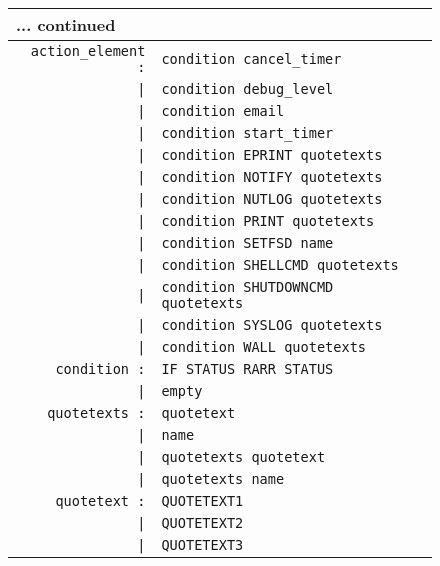 \documentclass[12pt]{article}
\begin{document}
\begin{figure}[ht]
\begin{center}
\begin{tabular}{|rp{0.55\LinePrinterwidth}|p{0.3\LinePrinterwidth}|}
\hline
\multicolumn{3}{|l|}{\small ... continued} \\ \hline\hline
\texttt{action\_element :} & \texttt{condition cancel\_timer} & \\
                \texttt{|} & \texttt{condition debug\_level} & \\
                \texttt{|} & \texttt{condition email} & \\
                \texttt{|} & \texttt{condition start\_timer} & \\
                \texttt{|} & \texttt{condition EPRINT quotetexts} & \\
                \texttt{|} & \texttt{condition NOTIFY quotetexts} & \\
                \texttt{|} & \texttt{condition NUTLOG quotetexts} & \\
                \texttt{|} & \texttt{condition PRINT quotetexts} & \\
                \texttt{|} & \texttt{condition SETFSD name} & \\
                \texttt{|} & \texttt{condition SHELLCMD quotetexts} & \\
                \texttt{|} & \texttt{condition SHUTDOWNCMD quotetexts} & \\
                \texttt{|} & \texttt{condition SYSLOG quotetexts} & \\
                \texttt{|} & \texttt{condition WALL quotetexts} & \\ \hline
\texttt{condition :}       & \texttt{IF STATUS RARR STATUS} & \\
          \texttt{|}       & \texttt{empty} & \\ \hline
\texttt{quotetexts :}      & \texttt{quotetext} & \\
           \texttt{|}      & \texttt{name} & \\ 
           \texttt{|}      & \texttt{quotetexts quotetext} & \\ 
           \texttt{|}      & \texttt{quotetexts name} & \\ \hline 
\texttt{quotetext :}       & \texttt{QUOTETEXT1} & \\
          \texttt{|}       & \texttt{QUOTETEXT2} & \\
          \texttt{|}       & \texttt{QUOTETEXT3} & \\

\end{tabular}
\end{center}
\end{figure}
\end{document}
